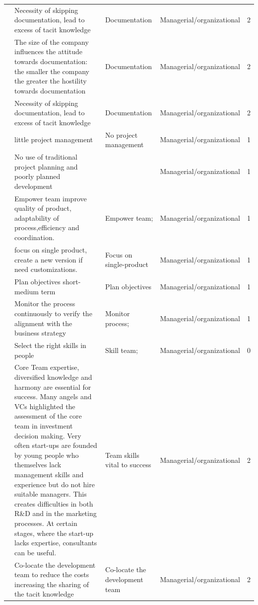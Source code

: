 \documentclass[final,5p,times,twocolumn]{elsarticle}
\begin{document}
\begin{center}
\begin{longtable}{|p{0.4in}|p{3in}|p{1.3in}|p{1in}|p{0.3in}|}
\cite{Coleman2007} & Necessity of skipping documentation, lead to excess of tacit knowledge & Documentation & Managerial/organizational & 2 \\
\cite{Coleman2007} & The size of the company influences the attitude towards documentation: the smaller the company the greater the hostility towards documentation & Documentation & Managerial/organizational & 2 \\
\cite{Coleman2008a} & Necessity of skipping documentation, lead to excess of tacit knowledge & Documentation & Managerial/organizational & 2 \\
\cite{Camel1994a} & little project management & No project management & Managerial/organizational & 1 \\
\cite{Camel1994a} & No use of traditional project planning and poorly planned development &       & Managerial/organizational & 1 \\
\cite{Sutton2000} & Empower team improve quality of product, adaptability of process,efficiency and coordination. & Empower team; & Managerial/organizational & 1 \\
\cite{Crowne2002} & focus on single product, create a new version if need customizations. & Focus on single-product & Managerial/organizational & 1 \\
\cite{Crowne2002} & Plan objectives short-medium term & Plan objectives & Managerial/organizational & 1 \\
\cite{Yogendra2002} & Monitor the process continuously to verify the alignment with the business strategy & Monitor process; & Managerial/organizational & 1 \\
\cite{Steenhuis2008} & Select the right skills in people & Skill team; & Managerial/organizational & 0 \\
\cite{Chorev2006} & Core Team expertise, diversified knowledge and harmony are essential for success. Many angels and VCs highlighted the assessment of the core team in investment decision making. Very often start-ups are founded by young people who themselves lack management skills and experience but do not hire suitable managers. This creates difficulties in both R\&D and in the marketing processes. At certain stages, where the start-up lacks expertise, consultants can be useful. & Team skills vital to success & Managerial/organizational & 2 \\
\cite{Coleman2007} & Co-locate the development team to reduce the costs increasing the sharing of the tacit knowledge & Co-locate the development team & Managerial/organizational & 2 \\

\end{longtable}
\end{center}
\end{document}
